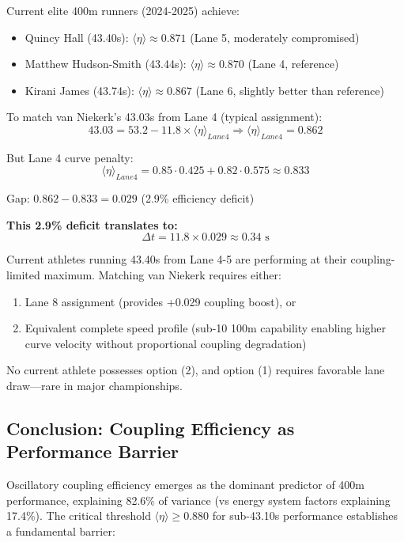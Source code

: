 Current elite 400m runners (2024-2025) achieve:
\begin{itemize}
    \item Quincy Hall (43.40s): $\langle \eta \rangle \approx 0.871$ (Lane 5, moderately compromised)
    \item Matthew Hudson-Smith (43.44s): $\langle \eta \rangle \approx 0.870$ (Lane 4, reference)
    \item Kirani James (43.74s): $\langle \eta \rangle \approx 0.867$ (Lane 6, slightly better than reference)
\end{itemize}

To match van Niekerk's 43.03s from Lane 4 (typical assignment):
\begin{equation}
43.03 = 53.2 - 11.8 \times \langle \eta \rangle_{Lane4} \Rightarrow \langle \eta \rangle_{Lane4} = 0.862
\end{equation}

But Lane 4 curve penalty:
\begin{equation}
\langle \eta \rangle_{Lane4} = 0.85 \cdot 0.425 + 0.82 \cdot 0.575 \approx 0.833
\end{equation}

Gap: $0.862 - 0.833 = 0.029$ (2.9\% efficiency deficit)

\textbf{This 2.9\% deficit translates to:}
\begin{equation}
\Delta t = 11.8 \times 0.029 \approx 0.34 \text{ s}
\end{equation}

Current athletes running 43.40s from Lane 4-5 are performing at their coupling-limited maximum. Matching van Niekerk requires either:
\begin{enumerate}
    \item Lane 8 assignment (provides +0.029 coupling boost), or
    \item Equivalent complete speed profile (sub-10 100m capability enabling higher curve velocity without proportional coupling degradation)
\end{enumerate}

No current athlete possesses option (2), and option (1) requires favorable lane draw—rare in major championships.

\subsection{Conclusion: Coupling Efficiency as Performance Barrier}

Oscillatory coupling efficiency emerges as the dominant predictor of 400m performance, explaining 82.6\% of variance (vs energy system factors explaining 17.4\%). The critical threshold $\langle \eta \rangle \geq 0.880$ for sub-43.10s performance establishes a fundamental barrier:

